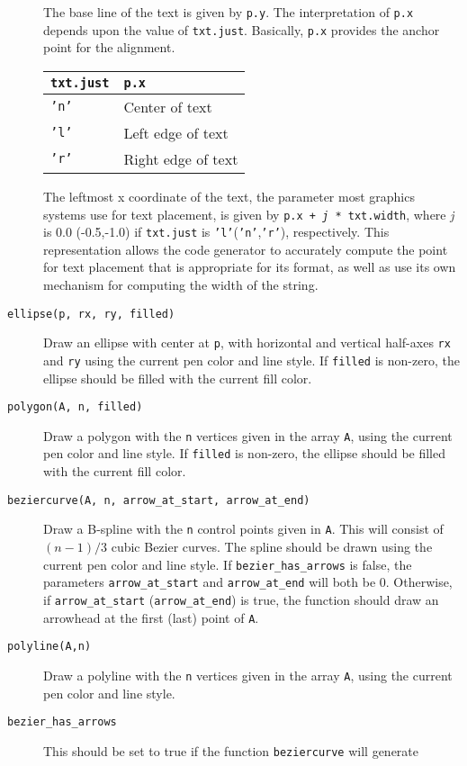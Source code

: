 \begin{description}
The base line of the text is given by {\tt p.y}. The interpretation
of {\tt p.x} depends upon the value of {\tt txt.just}. Basically,
{\tt p.x} provides the anchor point for the alignment.
\begin{center}
\begin{tabular}{ll}
{\tt txt.just} & {\tt p.x} \\ \hline
{\tt 'n'} & Center of text \\
{\tt 'l'} & Left edge of text \\
{\tt 'r'} & Right edge of text \\
\end{tabular}
\end{center}
The leftmost x coordinate of the text, the parameter most graphics
systems use for text placement, is given by 
{\tt p.x + {\em j} * txt.width}, where {\em j} is 0.0 (-0.5,-1.0)
if {\tt txt.just} is {\tt 'l'}({\tt 'n'},{\tt 'r'}), respectively.
This representation allows the code generator to accurately compute
the point for text placement that is appropriate for its format, as
well as use its own mechanism for computing the width of the string.
\item[{\tt ellipse(p, rx, ry, filled)}]
Draw an ellipse with center at {\tt p}, with horizontal and vertical 
half-axes {\tt rx} and {\tt ry} using the current pen color and line style.
If {\tt filled} is non-zero, the ellipse should be filled with the current
fill color.
\item[{\tt polygon(A, n, filled)}]
Draw a polygon with the {\tt n} vertices given in the array {\tt A}, 
using the current pen color and line style.
If {\tt filled} is non-zero, the ellipse should be filled with the current
fill color.
\item[{\tt beziercurve(A, n, arrow\_at\_start, arrow\_at\_end)}]
Draw a B-spline with the {\tt n} control points given in {\tt A}. This will
consist of $(n - 1)/3$ cubic Bezier curves. The spline should be drawn
using the current pen color and line style.
If {\tt  bezier\_has\_arrows} is false, the parameters 
{\tt arrow\_at\_start} and {\tt arrow\_at\_end}
will both be 0. Otherwise, if {\tt arrow\_at\_start} ({\tt arrow\_at\_end}) 
is true, the function should draw an arrowhead at the 
first (last) point of {\tt A}.
\item[{\tt polyline(A,n)}]
Draw a polyline with the {\tt n} vertices given in the array {\tt A}, 
using the current pen color and line style.
\item[{\tt bezier\_has\_arrows}]
This should be set to true if the function {\tt beziercurve} will generate

\end{description}

